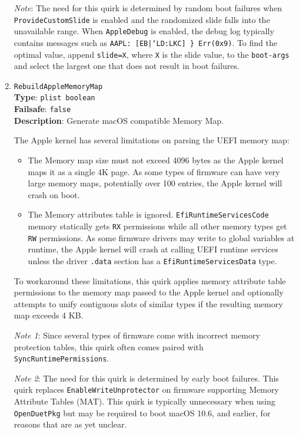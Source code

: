 \documentclass[]{article}
\providecommand{\tightlist}{%
  \setlength{\itemsep}{0pt}\setlength{\parskip}{0pt}}
\begin{document}
\begin{enumerate}
  \emph{Note}: The need for this quirk is determined by random boot failures
  when \texttt{ProvideCustomSlide} is enabled and the randomized slide falls
  into the unavailable range. When \texttt{AppleDebug} is enabled, the
  debug log typically contains messages such as \texttt{AAPL: [EB|`LD:LKC] \} Err(0x9)}.
  To find the optimal value, append \texttt{slide=X}, where \texttt{X} is the slide value,
  to the \texttt{boot-args} and select the largest one that does not result in boot failures.

\item
  \texttt{RebuildAppleMemoryMap}\\
  \textbf{Type}: \texttt{plist\ boolean}\\
  \textbf{Failsafe}: \texttt{false}\\
  \textbf{Description}: Generate macOS compatible Memory Map.

  The Apple kernel has several limitations on parsing the UEFI memory map:

  \begin{itemize}
  \tightlist
  \item The Memory map size must not exceed 4096 bytes as the Apple kernel maps
    it as a single 4K page. As some types of firmware can have very large memory maps,
    potentially over 100 entries, the Apple kernel will crash on boot.
  \item The Memory attributes table is ignored. \texttt{EfiRuntimeServicesCode}
    memory statically gets \texttt{RX} permissions while all other memory types
    get \texttt{RW} permissions. As some firmware drivers may write to global
    variables at runtime, the Apple kernel will crash at calling UEFI runtime services
    unless the driver \texttt{.data} section has a \texttt{EfiRuntimeServicesData}
    type.
  \end{itemize}

  To workaround these limitations, this quirk applies memory attribute table
  permissions to the memory map passed to the Apple kernel and optionally attempts
  to unify contiguous slots of similar types if the resulting memory map exceeds
  4 KB.

  \emph{Note 1}: Since several types of firmware come with incorrect memory protection
  tables, this quirk often comes paired with \texttt{SyncRuntimePermissions}.

  \emph{Note 2}: The need for this quirk is determined by early boot failures.
  This quirk replaces \texttt{EnableWriteUnprotector} on firmware supporting
  Memory Attribute Tables (MAT). This quirk is typically unnecessary when using
  \texttt{OpenDuetPkg} but may be required to boot macOS 10.6, and earlier, for
  reasons that are as yet unclear.


\end{enumerate}
\end{document}
